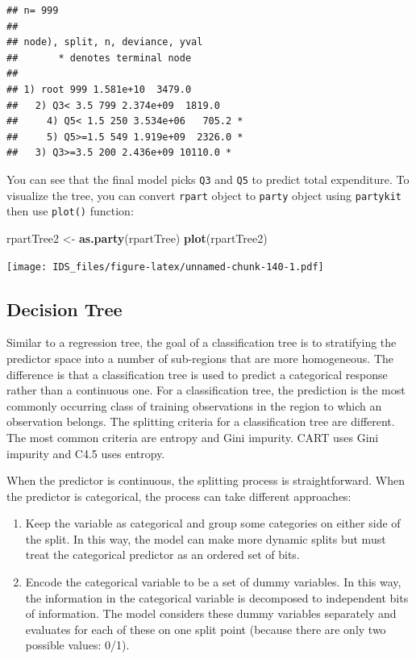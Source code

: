 \documentclass[12pt,]{krantz}
\makeatletter
\newenvironment{Shaded}{\begin{snugshade}}{\end{snugshade}}
\newcommand{\KeywordTok}[1]{\textcolor[rgb]{0.27,0.27,0.27}{\textbf{#1}}}
\newcommand{\NormalTok}[1]{#1}
\newcommand{\StringTok}[1]{\textcolor[rgb]{0.5,0.5,0.5}{#1}}
\providecommand{\tightlist}{%
  \setlength{\itemsep}{0pt}\setlength{\parskip}{0pt}}
\newenvironment{kframe}{%
\medskip{}
\setlength{\fboxsep}{.8em}
 \def\at@end@of@kframe{}%
 \ifinner\ifhmode%
  \def\at@end@of@kframe{\end{minipage}}%
  \begin{minipage}{\columnwidth}%
 \fi\fi%
 \def\FrameCommand##1{\hskip\@totalleftmargin \hskip-\fboxsep
 \colorbox{shadecolor}{##1}\hskip-\fboxsep
     \hskip-\linewidth \hskip-\@totalleftmargin \hskip\columnwidth}%
 \MakeFramed {\advance\hsize-\width
   \@totalleftmargin\z@ \linewidth\hsize
   \@setminipage}}%
 {\par\unskip\endMakeFramed%
 \at@end@of@kframe}
\renewenvironment{Shaded}{\begin{kframe}}{\end{kframe}}
\makeatother
\begin{document}
\begin{verbatim}
## n= 999 
## 
## node), split, n, deviance, yval
##       * denotes terminal node
## 
## 1) root 999 1.581e+10  3479.0  
##   2) Q3< 3.5 799 2.374e+09  1819.0  
##     4) Q5< 1.5 250 3.534e+06   705.2 *
##     5) Q5>=1.5 549 1.919e+09  2326.0 *
##   3) Q3>=3.5 200 2.436e+09 10110.0 *
\end{verbatim}

You can see that the final model picks \texttt{Q3} and \texttt{Q5} to predict total expenditure. To visualize the tree, you can convert \texttt{rpart} object to \texttt{party} object using \texttt{partykit} then use \texttt{plot()} function:

\begin{Shaded}
\begin{Highlighting}[]
\NormalTok{rpartTree2 <-}\StringTok{ }\KeywordTok{as.party}\NormalTok{(rpartTree)}
\KeywordTok{plot}\NormalTok{(rpartTree2)}
\end{Highlighting}
\end{Shaded}

\texttt{[image: IDS\_files/figure-latex/unnamed-chunk-140-1.pdf]}

\hypertarget{decision-tree}{%
\subsection{Decision Tree}\label{decision-tree}}

Similar to a regression tree, the goal of a classification tree is to stratifying the predictor space into a number of sub-regions that are more homogeneous. The difference is that a classification tree is used to predict a categorical response rather than a continuous one. For a classification tree, the prediction is the most commonly occurring class of training observations in the region to which an observation belongs. The splitting criteria for a classification tree are different. The most common criteria are entropy and Gini impurity. CART uses Gini impurity and C4.5 uses entropy.

When the predictor is continuous, the splitting process is straightforward. When the predictor is categorical, the process can take different approaches:

\begin{enumerate}
\def\labelenumi{\arabic{enumi}.}
\tightlist
\item
  Keep the variable as categorical and group some categories on either side of the split. In this way, the model can make more dynamic splits but must treat the categorical predictor as an ordered set of bits.
\item
  Encode the categorical variable to be a set of dummy variables. In this way, the information in the categorical variable is decomposed to independent bits of information. The model considers these dummy variables separately and evaluates for each of these on one split point (because there are only two possible values: 0/1).
\end{enumerate}
\end{document}
